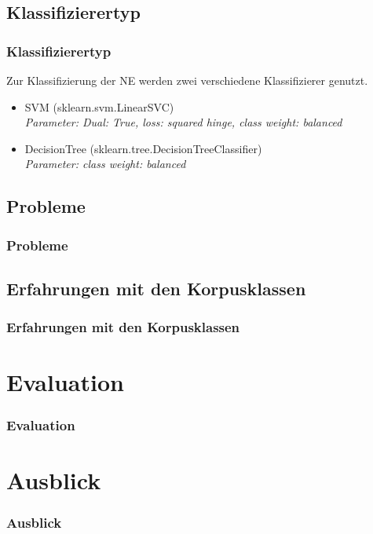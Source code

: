 \documentclass{beamer}
\begin{document}
	\subsection{Klassifizierertyp}
	\begin{frame}
		\frametitle{Klassifizierertyp}
		Zur Klassifizierung der NE werden zwei verschiedene Klassifizierer genutzt.\\
		
		\begin{itemize}
			\item SVM (sklearn.svm.LinearSVC)\\
				\em{Parameter: Dual: True, loss: squared hinge, class weight: balanced}
			\item DecisionTree (sklearn.tree.DecisionTreeClassifier)\\
			\em{Parameter: class weight: balanced}
		\end{itemize}
	\end{frame}
	\subsection{Probleme}
	\begin{frame}
		\frametitle{Probleme}
		
	\end{frame}
	\subsection{Erfahrungen mit den Korpusklassen}
	\begin{frame}
		\frametitle{Erfahrungen mit den Korpusklassen}
		
	\end{frame}
\section{Evaluation}
	\begin{frame}
		\frametitle{Evaluation}
		
	\end{frame}
\section{Ausblick}
	\begin{frame}
		\frametitle{Ausblick}
		
	\end{frame}
\end{document}
